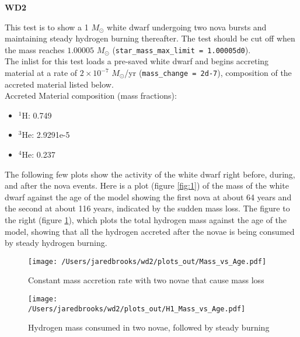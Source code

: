 \documentclass{article}
\begin{document}
	
	\begin{center}
		\begin{Large}
			\textbf{WD2}\\
		\end{Large}
	\end{center}
	

        This test is to show a 1 $M_\odot$ white dwarf undergoing two nova bursts and maintaining steady hydrogen burning thereafter.  The test should be cut off when the mass reaches $1.00005$ $M_\odot$ (\texttt{star\_mass\_max\_limit = 1.00005d0}).\\

        The inlist for this test loads a pre-saved white dwarf and begins accreting material at a rate of $2\times10^{-7}$ $M_\odot$/yr (\texttt{mass\_change = 2d-7}), composition of the accreted material listed below.\\

	\noindent Accreted Material composition (mass fractions):
        \begin{itemize}
        \item $^1$H: 0.749
        \item $^3$He: 2.9291e-5
        \item $^4$He: 0.237
        \end{itemize}

        The following few plots show the activity of the white dwarf right before, during, and after the nova events.  Here is a plot (figure \ref{fig:1}) of the mass of the white dwarf against the age of the model showing the first nova at about 64 years and the second at about 116 years, indicated by the sudden mass loss.  The figure to the right (figure \ref{fig:4}), which plots the total hydrogen mass against the age of the model, showing that all the hydrogen accreted after the novae is being consumed by steady hydrogen burning.

	\begin{figure}[H]
          \begin{minipage}[b]{0.5\linewidth}
	    \centering
	    \texttt{[image: /Users/jaredbrooks/wd2/plots\_out/Mass\_vs\_Age.pdf]}
	    \caption{Constant mass accretion rate with two novae that cause mass loss}
	    \label{fig:1}
          \end{minipage}
          \hspace{0cm}
          \begin{minipage}[b]{0.5\linewidth}
            \centering
            \texttt{[image: /Users/jaredbrooks/wd2/plots\_out/H1\_Mass\_vs\_Age.pdf]}
            \caption{Hydrogen mass consumed in two novae, followed by steady burning}
            \label{fig:4}
          \end{minipage}
	\end{figure}
        
\end{document}
